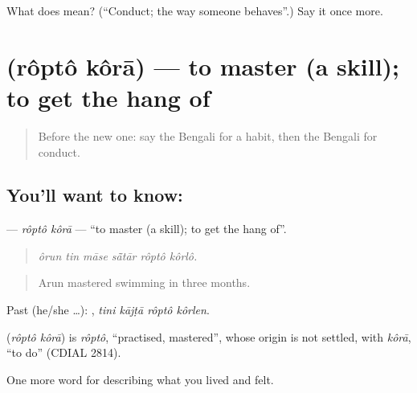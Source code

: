 \begin{tcolorbox}[breakable,colback=teal!4,colframe=teal!35!black,title={Before you move on}]
What does  mean? (\textquotedblleft{}Conduct; the way someone behaves\textquotedblright{}.) Say it once more.
\end{tcolorbox}
\section[\texorpdfstring{\bn{রপ্ত} \bn{করা} (rôptô kôrā)}{রপ্ত করা (rôptô kôrā)}]{  (rôptô kôrā) — to master (a skill); to get the hang of}

\label{lesson:BN-C456-ropto-kora}



\begin{quote}
Before the new one: say the Bengali for a habit, then the Bengali for conduct.
\end{quote}

\subsection*{You'll want to know:  }
\textbf{ } — \emph{rôptô kôrā} — \textquotedblleft{}to master (a skill); to get the hang of\textquotedblright{}.

\begin{quote}
     
\end{quote}

\begin{quote}
\emph{ôrun tin māse sā̃tār rôptô kôrlô.}
\end{quote}

\begin{quote}
Arun mastered swimming in three months.
\end{quote}

Past (he/she …):    , \emph{tini kājṭā rôptô kôrlen}.

\begin{cousinweb}
\textbf{ } (\emph{rôptô kôrā}) is \emph{rôptô}, \textquotedblleft{}practised, mastered\textquotedblright{}, whose origin is not settled, with \emph{kôrā}, \textquotedblleft{}to do\textquotedblright{} (CDIAL 2814).
\end{cousinweb}

\begin{grammarlens}[title={What you've built}]
One more word for describing what you lived and felt.
\end{grammarlens}

